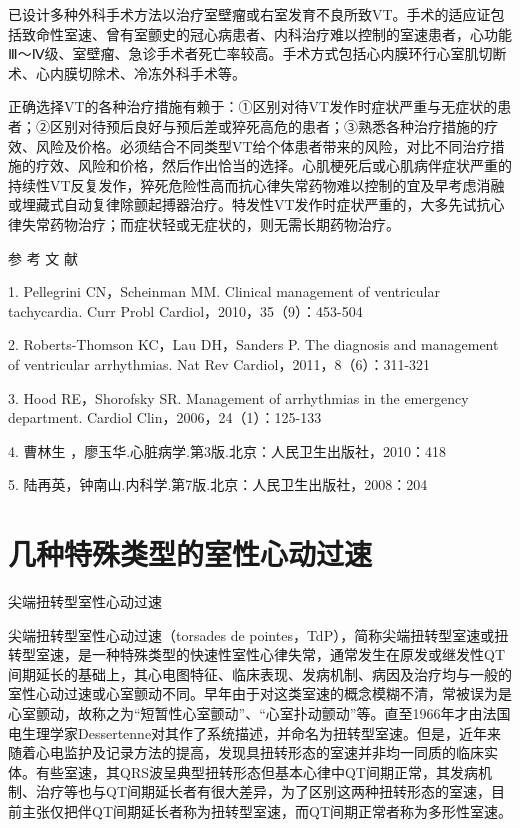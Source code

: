 已设计多种外科手术方法以治疗室壁瘤或右室发育不良所致VT。手术的适应证包括致命性室速、曾有室颤史的冠心病患者、内科治疗难以控制的室速患者，心功能Ⅲ～Ⅳ级、室壁瘤、急诊手术者死亡率较高。手术方式包括心内膜环行心室肌切断术、心内膜切除术、冷冻外科手术等。

正确选择VT的各种治疗措施有赖于：①区别对待VT发作时症状严重与无症状的患者；②区别对待预后良好与预后差或猝死高危的患者；③熟悉各种治疗措施的疗效、风险及价格。必须结合不同类型VT给个体患者带来的风险，对比不同治疗措施的疗效、风险和价格，然后作出恰当的选择。心肌梗死后或心肌病伴症状严重的持续性VT反复发作，猝死危险性高而抗心律失常药物难以控制的宜及早考虑消融或埋藏式自动复律除颤起搏器治疗。特发性VT发作时症状严重的，大多先试抗心律失常药物治疗；而症状轻或无症状的，则无需长期药物治疗。

\hypertarget{text00292.htmlux5cux23CHP10-2-5-4}{}
参 考 文 献

1. Pellegrini CN，Scheinman MM. Clinical management of ventricular
tachycardia. Curr Probl Cardiol，2010，35（9）：453-504

2. Roberts-Thomson KC，Lau DH，Sanders P. The diagnosis and management
of ventricular arrhythmias. Nat Rev Cardiol，2011，8（6）：311-321

3. Hood RE，Shorofsky SR. Management of arrhythmias in the emergency
department. Cardiol Clin，2006，24（1）：125-133

4. 曹林生 ，廖玉华.心脏病学.第3版.北京：人民卫生出版社，2010：418

5. 陆再英，钟南山.内科学.第7版.北京：人民卫生出版社，2008：204

\protect\hypertarget{text00293.html}{}{}

\section{几种特殊类型的室性心动过速}

\hypertarget{text00293.htmlux5cux23CHP10-2-6-1}{}
尖端扭转型室性心动过速

尖端扭转型室性心动过速（torsades de
pointes，TdP），简称尖端扭转型室速或扭转型室速，是一种特殊类型的快速性室性心律失常，通常发生在原发或继发性QT间期延长的基础上，其心电图特征、临床表现、发病机制、病因及治疗均与一般的室性心动过速或心室颤动不同。早年由于对这类室速的概念模糊不清，常被误为是心室颤动，故称之为“短暂性心室颤动”、“心室扑动颤动”等。直至1966年才由法国电生理学家Dessertenne对其作了系统描述，并命名为扭转型室速。但是，近年来随着心电监护及记录方法的提高，发现具扭转形态的室速并非均一同质的临床实体。有些室速，其QRS波呈典型扭转形态但基本心律中QT间期正常，其发病机制、治疗等也与QT间期延长者有很大差异，为了区别这两种扭转形态的室速，目前主张仅把伴QT间期延长者称为扭转型室速，而QT间期正常者称为多形性室速。

